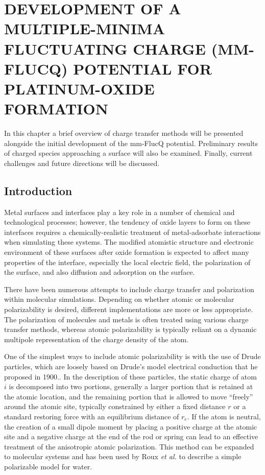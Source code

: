 
\chapter{DEVELOPMENT OF A MULTIPLE-MINIMA FLUCTUATING CHARGE (MM-FLUCQ) POTENTIAL FOR PLATINUM-OXIDE FORMATION}
\label{chap:mmFlucQ}


In this chapter a brief overview of charge transfer methods will be presented
alongside the initial development of the mm-FlucQ potential.  Preliminary
results of charged species approaching a  surface will also be
examined. Finally, current challenges and future directions will be discussed.


\section{Introduction}
Metal surfaces and interfaces play a key role in a number of chemical and
technological processes; however, the tendency of oxide layers to form on these
interfaces requires a chemically-realistic treatment of metal-adsorbate
interactions when simulating these systems\citep{Streitz:1994mw, Duin:2010dk,
Devine:2011bk, Fantauzzi:2014pb}.  The modified atomistic structure and
electronic environment of these surfaces after oxide formation is expected to
affect many properties of the interface, especially the local electric field,
the polarization of the surface, and also diffusion and adsorption on the
surface.\citep{Streitz:1994mw, Getman:2008sp, Bray:2011hq,Small:2012dw}

There have been numerous attempts to include charge transfer and polarization
within molecular simulations.\citep{Rick:1994ss, Streitz:1994mw,
Siepmann:1995es, Iori:2008ic, Iori:2009au} Depending on whether atomic or
molecular polarizability is desired, different implementations are more or less
appropriate. The polarization of molecules and metals is often treated using
various charge transfer methods, whereas atomic polarizability is typically
reliant on a dynamic multipole representation of the charge density of the
atom.

One of the simplest ways to include atomic polarizability is with the use of
Drude particles, which are loosely based on Drude's model electrical
conduction that he proposed in 1900.\citep{Drude:1900aa, Drude:1900bb}. In the
description of these particles, the static charge of atom $i$ is decomposed
into two portions, generally a larger portion that is retained at the atomic
location, and the remaining portion that is allowed to move ``freely'' around
the atomic site, typically constrained by either a fixed distance $r$ or a
standard restoring force with an equilibrium distance of $r_e$. If the atom is
neutral, the creation of a small dipole moment by placing a positive charge at
the atomic site and a negative charge at the end of the rod or spring can lead
to an effective treatment of the anisotropic atomic polarization. This method
can be expanded to molecular systems and has been used by Roux {\em et al.} to
describe a simple polarizable model for water.\citep{Roux:2003ho}

